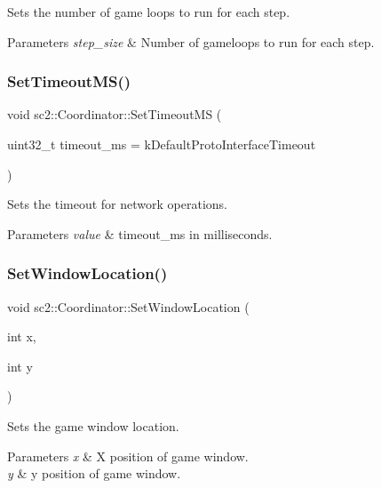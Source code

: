 Sets the number of game loops to run for each step. 
\begin{DoxyParams}{Parameters}
{\em step\+\_\+size} & Number of gameloops to run for each step. \\
\hline
\end{DoxyParams}
\mbox{\label{classsc2_1_1_coordinator_aadbfd927d66314a4eb949b2de2ae37b4}} 
\subsubsection{\texorpdfstring{Set\+Timeout\+M\+S()}{SetTimeoutMS()}}
{\footnotesize\ttfamily void sc2\+::\+Coordinator\+::\+Set\+Timeout\+MS (\begin{DoxyParamCaption}\item[{uint32\+\_\+t}]{timeout\+\_\+ms = {\ttfamily kDefaultProtoInterfaceTimeout} }\end{DoxyParamCaption})}

Sets the timeout for network operations. 
\begin{DoxyParams}{Parameters}
{\em value} & timeout\+\_\+ms in milliseconds. \\
\hline
\end{DoxyParams}
\mbox{\label{classsc2_1_1_coordinator_a6e372788e11c3916fdf1982eb2e55511}} 
\subsubsection{\texorpdfstring{Set\+Window\+Location()}{SetWindowLocation()}}
{\footnotesize\ttfamily void sc2\+::\+Coordinator\+::\+Set\+Window\+Location (\begin{DoxyParamCaption}\item[{int}]{x,  }\item[{int}]{y }\end{DoxyParamCaption})}

Sets the game window location. 
\begin{DoxyParams}{Parameters}
{\em x} & X position of game window. \\
\hline
{\em y} & y position of game window. \\
\hline
\end{DoxyParams}
\mbox{\label{classsc2_1_1_coordinator_a9b0eca71a6f7575f35d1dd5c3e5d73cf}} 
